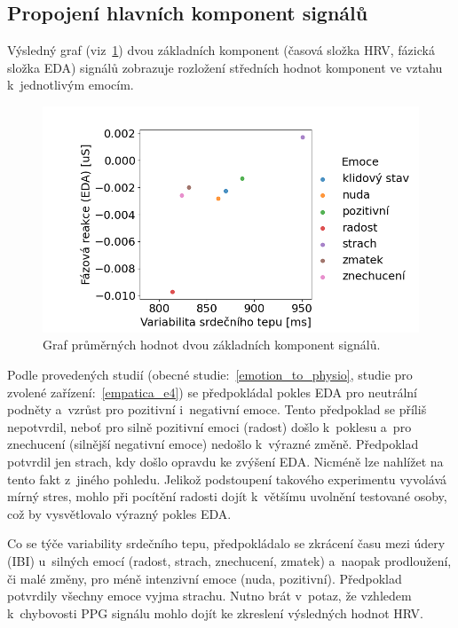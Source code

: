     \vspace{6mm}
    
    \subsection{Propojení hlavních komponent signálů}
    
    Výsledný graf (viz~\ref{fig:rate_vs_phasic}) dvou základních komponent (časová složka HRV, fázická složka EDA) signálů zobrazuje rozložení středních hodnot komponent ve vztahu k~jednotlivým emocím. 
    
    \begin{figure}[H]
        \centering
        \includegraphics[width=\textwidth]{obrazky-figures/hrv_vs_phasic.png}
        \caption{Graf průměrných hodnot dvou základních komponent signálů.}
        \label{fig:rate_vs_phasic}
    \end{figure}
    
    Podle provedených studií (obecné studie:~\ref{emotion_to_physio}, studie pro zvolené zařízení:~\ref{empatica_e4}) se předpokládal pokles EDA pro neutrální podněty a~vzrůst pro pozitivní i~negativní emoce. Tento předpoklad se příliš nepotvrdil, neboť pro silně pozitivní emoci (radost) došlo k~poklesu a~pro znechucení (silnější negativní emoce) nedošlo k~výrazné změně. Předpoklad potvrdil jen strach, kdy došlo opravdu ke zvýšení EDA. Nicméně lze nahlížet na tento fakt z~jiného pohledu. Jelikož podstoupení takového experimentu vyvolává mírný stres, mohlo při pocítění radosti dojít k~většímu uvolnění testované osoby, což by vysvětlovalo výrazný pokles EDA. 
    
    Co se týče variability srdečního tepu, předpokládalo se zkrácení času mezi údery (IBI) u~silných emocí (radost, strach, znechucení, zmatek) a~naopak prodloužení, či malé změny, pro méně intenzivní emoce (nuda, pozitivní). Předpoklad potvrdily všechny emoce vyjma strachu. Nutno brát v~potaz, že vzhledem k~chybovosti PPG signálu mohlo dojít ke zkreslení výsledných hodnot HRV.
    
